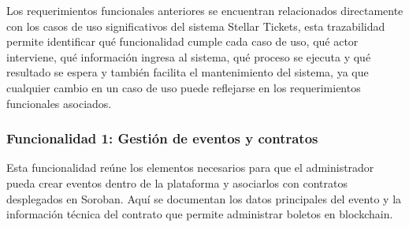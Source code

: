\documentclass[12pt,letterpaper]{article}
\begin{document}
Los requerimientos funcionales anteriores se encuentran relacionados directamente con los casos de uso significativos del sistema Stellar Tickets, esta trazabilidad permite identificar qué funcionalidad cumple cada caso de uso, qué actor interviene, qué información ingresa al sistema, qué proceso se ejecuta y qué resultado se espera y también facilita el mantenimiento del sistema, ya que cualquier cambio en un caso de uso puede reflejarse en los requerimientos funcionales asociados.

\subsubsection{Funcionalidad 1: Gestión de eventos y contratos}
Esta funcionalidad reúne los elementos necesarios para que el administrador pueda crear eventos dentro de la plataforma y asociarlos con contratos desplegados en Soroban. Aquí se documentan los datos principales del evento y la información técnica del contrato que permite administrar boletos en blockchain.
\end{document}
